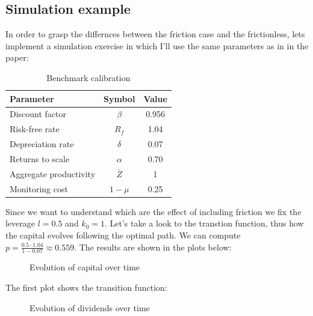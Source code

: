 \documentclass[12pt]{article}
\begin{document}
\subsection{Simulation example}
In order to grasp the differnces between the friction case and the frictionless, lets implement a simulation exercise in
which I'll use the same parameters as in in the \cite{OsePap17} paper:
\begin{table}
    \centering
    \begin{tabular}{lcc}
    \hline Parameter & Symbol & Value \\
    \hline \hline Discount factor & $\beta$ & 0.956 \\
    Risk-free rate & $R_f$ & 1.04 \\
    Depreciation rate & $\delta$ & 0.07 \\
    Returns to scale & $\alpha$ & 0.70 \\
    Aggregate productivity & $\bar{Z}$ & 1 \\
    Monitoring cost & $1-\mu$ & 0.25 \\
    \hline
    \end{tabular}
    \caption{Benchmark calibration}
\end{table}
Since we want to understand which are the effect of including friction we fix the leverage \(l=0.5\) and \(k_0=1\). Let's take a look
to the transtion function, thus how the capital evolves following the optimal path. 
We can compute \(p=\frac{0.5 \cdot 1.04}{1-0.07} \approx 
0.559 \). The results are shown in the plots below:
\begin{figure}[htbp]
    \centering
    \caption{Evolution of capital over time}
\end{figure}
The first plot shows the transition function: 
\begin{figure}[htbp]
    \centering
    \caption{Evolution of dividends over time}
\end{figure}
\end{document}

